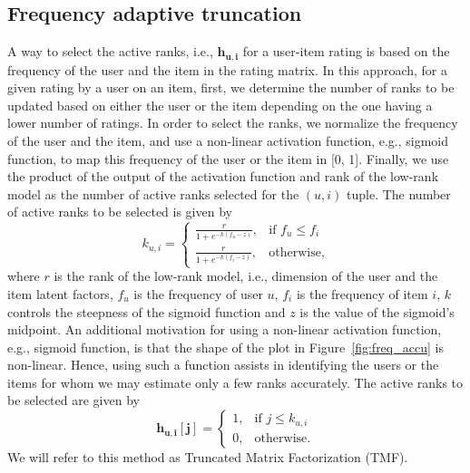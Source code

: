 \subsection{Frequency adaptive truncation}
A way to select the active ranks, i.e., $\bm{h_{u,i}}$ for a user-item rating is
based on the frequency of the user and the item in the rating matrix. 
In this approach, for a given rating by a user on an item, first, we determine
the number of ranks to be updated based on either the user or the item depending
on the one having a lower number of ratings. 
In order to select the ranks, we normalize the frequency of the user and the
item,
and use a non-linear activation function, e.g., sigmoid function, to map
this frequency of the user or the item in [0, 1]. 
Finally, we use the product of the output of the activation function
and rank of the low-rank model as the number of active ranks selected
for the $(u,i)$ tuple. The number of active ranks to be selected is given by
\begin{equation} \label{rank_no_eq}
  k_{u,i} = 
  \begin{cases}
    \frac{r}{1 + e^{-k(f_u -  z)}},& \text{if } f_u \leq f_i \\
    \frac{r}{1 + e^{-k(f_i - z)}},& \text{otherwise},
  \end{cases}
\end{equation}
\noindent where $r$ is the rank of the low-rank model, i.e., dimension of the user and the item latent factors,
$f_u$ is the frequency of user $u$, $f_i$ is the frequency of item $i$, $k$
controls the steepness of the sigmoid function and $z$ is the value
of the sigmoid's midpoint. 
An additional motivation for using a non-linear activation function, e.g.,
sigmoid function, is that the shape of the plot in Figure~\ref{fig:freq_accu} is non-linear.
Hence, using such a function assists in identifying the users or the items for whom we may estimate only a few ranks accurately.
The active ranks to be selected are given by
\begin{equation} \label{rank_wt_eq}
  \bm{h_{u,i}[j]} = 
  \begin{cases}
    1,& \text{if } j \leq k_{u,i} \\
    0,& \text{otherwise}.
  \end{cases}
\end{equation}
We will refer to this method as Truncated Matrix Factorization (TMF). 

